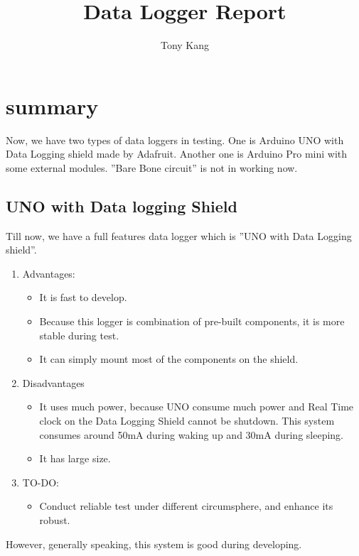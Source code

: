 \documentclass[a4paper,12pt]{article}
\title{Data Logger Report}
\author{Tony Kang}
\begin{document}
\maketitle
\tableofcontents

\newpage
\section{summary}
Now, we have two types of data loggers in testing. One is Arduino UNO with Data Logging shield made by Adafruit. Another one is Arduino Pro mini with some external modules. ''Bare Bone circuit'' is not in working now.
\subsection{UNO with Data logging Shield}
Till now, we have a full features data logger which is ''UNO with Data Logging shield''. 
\begin{enumerate}
\item Advantages:
\begin{itemize}
\item It is fast to develop.
\item Because this logger is combination of pre-built components, it is more stable during test.
\item It can simply mount most of the components on the shield.
\end{itemize}
\item Disadvantages
\begin{itemize}
\item It uses much power, because UNO consume much power and Real Time clock on the Data Logging Shield cannot be shutdown. This system consumes around 50mA during waking up and 30mA during sleeping.
\item It has large size.
\end{itemize}
\item TO-DO:
\begin{itemize}
\item Conduct reliable test under different circumsphere, and enhance its robust.
\end{itemize}
\end{enumerate}
However, generally speaking, this system is good during developing.
\end{document}
